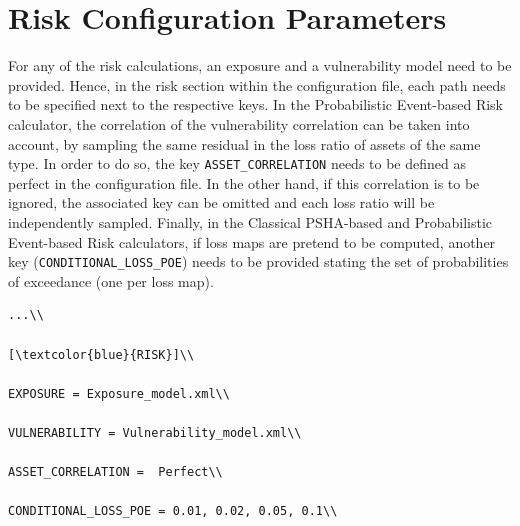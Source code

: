 \section{ Risk Configuration Parameters}

For any of the risk calculations, an exposure and a vulnerability model need to be provided. Hence, in the risk section within the configuration file, each path needs to be specified next to the respective keys. In the Probabilistic Event-based Risk calculator, the correlation of the vulnerability correlation can be taken into account, by sampling the same residual in the loss ratio of assets of the same type. In order to do so, the key \Verb+ASSET_CORRELATION+ needs to be defined as perfect in the configuration file. In the other hand, if this correlation is to be ignored, the associated key can be omitted and each loss ratio will be independently sampled. 
Finally, in the Classical PSHA-based and Probabilistic Event-based Risk calculators, if loss maps are pretend to be computed, another key (\Verb+CONDITIONAL_LOSS_POE+) needs to be provided stating the set of probabilities of exceedance (one per loss map).
 
\begin{Verbatim}[frame=single, commandchars=\\\{\}, samepage=true]
...\\

[\textcolor{blue}{RISK}]\\

EXPOSURE = Exposure_model.xml\\

VULNERABILITY = Vulnerability_model.xml\\

ASSET_CORRELATION =  Perfect\\

CONDITIONAL_LOSS_POE = 0.01, 0.02, 0.05, 0.1\\

\end{Verbatim}